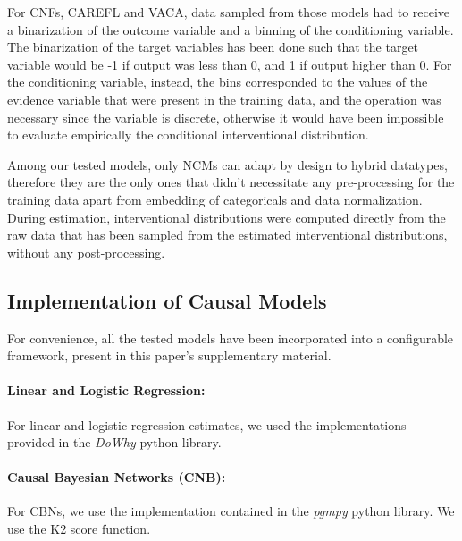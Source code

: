For CNFs, CAREFL and VACA, data sampled from those models had to receive a binarization of the outcome variable and a binning of the conditioning variable. The binarization of the target variables has been done such that the target variable would be -1 if output was less than 0, and 1 if output higher than 0. For the conditioning variable, instead, the bins corresponded to the values of the evidence variable that were present in the training data, and the operation was necessary since the variable is discrete, otherwise it would have been impossible to evaluate empirically the conditional interventional distribution.

Among our tested models, only NCMs can adapt by design to hybrid datatypes, therefore they are the only ones that didn't necessitate any pre-processing for the training data apart from embedding of categoricals and data normalization. During estimation, interventional distributions were computed directly from the raw data that has been sampled from the estimated interventional distributions, without any post-processing.

\subsection{Implementation of Causal Models} \label{sec:appendix_code}

For convenience, all the tested models have been incorporated into a configurable framework, present in this paper's supplementary material.

\paragraph{Linear and Logistic Regression:} For linear and logistic regression estimates, we used the implementations provided in the \textit{DoWhy} python library. 

\paragraph{Causal Bayesian Networks (CNB):} For CBNs, we use the implementation contained in the \textit{pgmpy} python library. We use the K2 score function.


